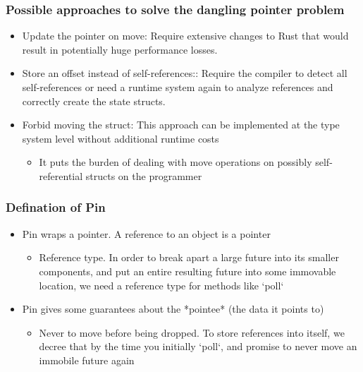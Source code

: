 \begin{frame}[fragile]
    \frametitle{Possible approaches to solve the dangling pointer problem}
% 
% 
    \begin{itemize}
        \item {\color{red}Update the pointer on move:} Require extensive changes to Rust that would result in potentially huge  performance losses.
        \item {\color{red}Store an offset instead of self-references:}: Require the compiler to {\color{red}detect all self-references} or need a runtime system again to analyze references and correctly create the  state structs.
        \item {\color{red}Forbid moving the struct:} This approach can be implemented at the type system level without additional  runtime costs
    	\begin{itemize}
    	    \item It puts the burden of dealing with  move operations on possibly self-referential structs on the programmer
    	\end{itemize}
    \end{itemize}

\end{frame}
\begin{frame}[fragile]
    \frametitle{Defination of Pin}
% 
% 
    \begin{itemize}
        \item Pin wraps a pointer. A reference to an object is a pointer
    	\begin{itemize}
    	    \item {\color{red}Reference type}. In order to break apart a large future into its smaller components, and put  an entire resulting future into some immovable location, we need a reference type for methods like `poll`
    	\end{itemize}
        \item Pin gives some guarantees about the *pointee* (the data it points to)
    	\begin{itemize}
    	    \item {\color{red}Never to move before being dropped}. To store references into itself, we decree that by the time you initially `poll`, and promise to never move an immobile future again
    	\end{itemize}
    \end{itemize}
% 
% 
% 
\end{frame}
